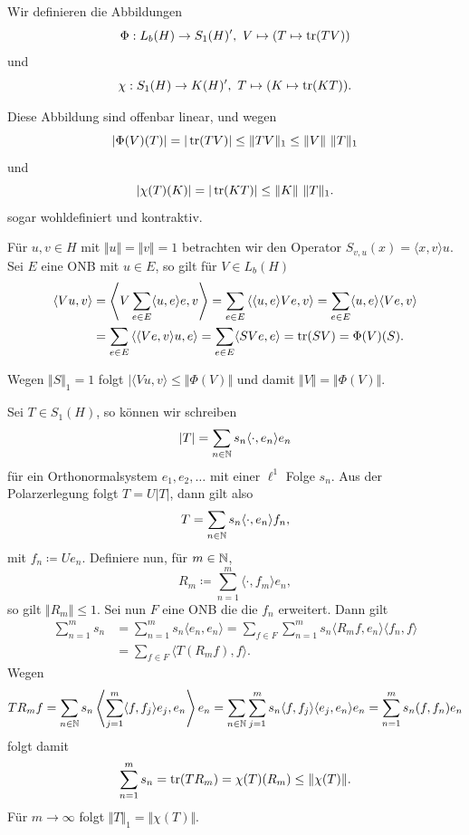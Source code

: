 \begin{definition}
    Wir definieren die Abbildungen
    \[
        \Phi : L_b(H) \to S_1(H)', \ V \mapsto (T \mapsto \operatorname*{tr} (TV))
    \]
    und
    \[
        \chi : S_1(H) \to K(H)', \ T \mapsto (K \mapsto \operatorname*{tr}(KT)).
    \]
\end{definition}

Diese Abbildung sind offenbar linear, und wegen
\[
    \vert \Phi(V)(T) \vert = \vert \operatorname*{tr}(TV) \vert \leq \Vert TV \Vert_1 \leq \Vert V \Vert \ \Vert T \Vert_1
\]
und
\[
    \vert \chi(T)(K) \vert = \vert \operatorname*{tr}(KT) \vert \leq \Vert K \Vert \ \Vert T \Vert_1.
\]
sogar wohldefiniert und kontraktiv.



Für $u, v \in H$ mit $\Vert u \Vert = \Vert v \Vert = 1$ betrachten wir den Operator $S_{v,u}(x) = \langle x, v \rangle u$. Sei $E$ eine ONB mit $u \in E$, so gilt für $V \in L_b(H)$
\begin{align*}
    \langle Vu, v \rangle
    &=
    \left\langle V \sum_{e \in E} \langle u, e \rangle e, v \right\rangle
    =
    \sum_{e \in E} \left\langle \langle u, e \rangle V e, v \right\rangle
    =
    \sum_{e \in E} \langle u, e \rangle \langle Ve, v \rangle
    \\ &=
    \sum_{e \in E} \left\langle \langle Ve, v \rangle u, e \right\rangle
    =
    \sum_{e \in E} \langle SVe, e \rangle
    =
    \operatorname*{tr}(SV)
    =
    \Phi(V)(S).
\end{align*}

Wegen $\Vert S \Vert_1 = 1$ folgt $\vert \langle Vu, v \rangle \leq \Vert \Phi(V) \Vert$ und damit $\Vert V \Vert = \Vert \Phi(V) \Vert$.

Sei $T \in S_1(H)$, so können wir schreiben
\[
    \vert T \vert = \sum_{n \in \mathbb{N}} s_n \langle \cdot, e_n \rangle e_n
\]
für ein Orthonormalsystem $e_1, e_2, \ldots$ mit einer $\ell^1$ Folge $s_n$. Aus der Polarzerlegung folgt $T = U \vert T \vert$, dann gilt also
\[
    T = \sum_{n \in \mathbb{N}} s_n \langle \cdot, e_n \rangle f_n,
\]
mit $f_n \coloneqq U e_n$. Definiere nun, für $m \in \mathbb{N}$,
\[
    R_m \coloneqq \sum_{n=1}^m \langle \cdot, f_m \rangle e_n,
\]
so gilt $\Vert R_m \Vert \leq 1$. Sei nun $F$ eine ONB die die $f_n$ erweitert. Dann gilt
\begin{align*}
    \sum_{n=1}^m s_n
    &=
    \sum_{n=1}^m s_n \langle e_n, e_n \rangle
    =
    \sum_{f \in F} \sum_{n=1}^m s_n \langle R_m f, e_n \rangle \langle f_n, f \rangle
    \\ &=
    \sum_{f \in F} \langle T(R_m f), f \rangle.
\end{align*}
Wegen
\[
    T R_m f
    =
    \sum_{n \in \mathbb{N}} s_n \left\langle \sum_{j=1}^m \langle f, f_j \rangle e_j, e_n \right\rangle e_n
    =
    \sum_{n \in \mathbb{N}} \sum_{j=1}^m s_n \langle f, f_j \rangle \langle e_j, e_n \rangle e_n
    =
    \sum_{n=1}^m s_n(f, f_n) e_n
\]
folgt damit
\[
    \sum_{n=1}^m s_n = \operatorname*{tr} (TR_m) = \chi(T)(R_m) \leq \Vert \chi(T) \Vert.
\]
Für $m \to \infty$ folgt $\Vert T \Vert_1 = \Vert \chi(T) \Vert$.

